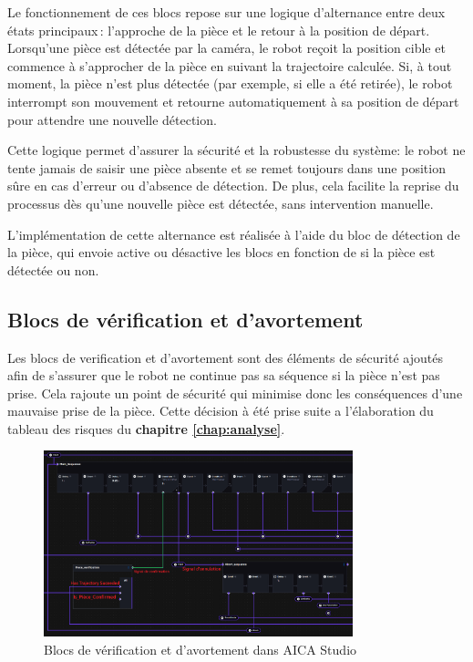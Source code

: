 Le fonctionnement de ces blocs repose sur une logique d'alternance entre deux états principaux : l'approche de la pièce et le retour à la position de départ. Lorsqu'une pièce est détectée par la caméra, le robot reçoit la position cible et commence à s'approcher de la pièce en suivant la trajectoire calculée. Si, à tout moment, la pièce n'est plus détectée (par exemple, si elle a été retirée), le robot interrompt son mouvement et retourne automatiquement à sa position de départ pour attendre une nouvelle détection.

Cette logique permet d'assurer la sécurité et la robustesse du système: le robot ne tente jamais de saisir une pièce absente et se remet toujours dans une position sûre en cas d'erreur ou d'absence de détection. De plus, cela facilite la reprise du processus dès qu'une nouvelle pièce est détectée, sans intervention manuelle.

L'implémentation de cette alternance est réalisée à l'aide du bloc de détection de la pièce, qui envoie active ou désactive les blocs en fonction de si la pièce est détectée ou non.


\subsection{Blocs de vérification et d'avortement}

Les blocs de verification et d'avortement sont des éléments de sécurité ajoutés afin de s'assurer que le robot ne continue pas sa séquence si la pièce n'est pas prise. Cela rajoute un point de sécurité qui minimise donc les conséquences d'une mauvaise prise de la pièce.  Cette décision à été prise suite a l'élaboration du tableau des risques du \textbf{chapitre \ref{chap:analyse}}.

\begin{figure}[H]
    \centering
    \includegraphics[width=0.8\textwidth]{assets/figures/AICA_abort_sequence.png}
    \caption{Blocs de vérification et d'avortement dans AICA Studio}
    \label{fig:verification_block}
\end{figure}

